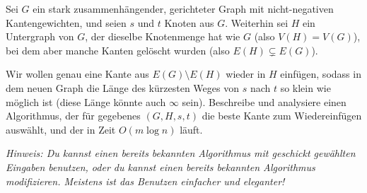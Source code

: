 \documentclass{uebung_cs}
\begin{document}
\begin{aufgabe}
  Sei $G$ ein stark zusammenhängender, gerichteter Graph mit nicht-negativen Kantengewichten, und seien $s$ und $t$ Knoten aus $G$.
  Weiterhin sei $H$ ein Untergraph von $G$, der dieselbe Knotenmenge hat wie $G$ (also $V(H)=V(G)$), bei dem aber manche Kanten gelöscht wurden (also $E(H)\subsetneq E(G)$).
  
  Wir wollen genau eine Kante aus $E(G)\setminus E(H)$ wieder in $H$ einfügen, sodass in dem neuen Graph die Länge des kürzesten Weges von $s$ nach $t$ so klein wie möglich ist (diese Länge könnte auch $\infty$ sein).
  Beschreibe und analysiere einen Algorithmus, der für gegebenes $(G,H,s,t)$ die beste Kante zum Wiedereinfügen auswählt, und der in Zeit $O(m\log n)$ läuft.
  
  \emph{Hinweis: Du kannst einen bereits bekannten Algorithmus mit geschickt gewählten Eingaben benutzen, oder du kannst einen bereits bekannten Algorithmus modifizieren. Meistens ist das Benutzen einfacher und eleganter!}

\end{aufgabe}
\end{document}
